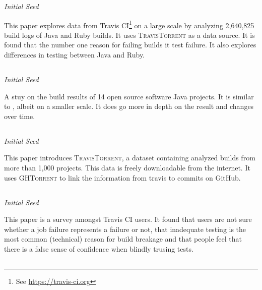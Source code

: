 \documentclass[]{book}
\let\rmarkdownfootnote\footnote%
\def\footnote{\protect\rmarkdownfootnote}
\begin{document}
\emph{Initial Seed}

This paper explores data from Travis CI\footnote{See
  \url{https://travis-ci.org}} on a large scale by analyzing 2,640,825
build logs of Java and Ruby builds. It uses \textsc{TravisTorrent} as a
data source. It is found that the number one reason for failing builds
it test failure. It also explores differences in testing between Java
and Ruby.

\subsection{\texorpdfstring{\citet{rausch2017empirical}}{@rausch2017empirical}}\label{rausch2017empirical}

\emph{Initial Seed}

A stuy on the build results of 14 open source software Java projects. It
is similar to \citet{beller2017oops}, albeit on a smaller scale. It does
go more in depth on the result and changes over time.

\subsection{\texorpdfstring{\citet{beller2017travistorrent}}{@beller2017travistorrent}}\label{beller2017travistorrent}

\emph{Initial Seed}

This paper introduces \textsc{TravisTorrent}, a dataset containing
analyzed builds from more than 1,000 projects. This data is freely
downloadable from the internet. It uses \textsc{GHTorrent} to link the
information from travis to commits on GitHub.

\subsection{\texorpdfstring{\citet{pinto2018work}}{@pinto2018work}}\label{pinto2018work}

\emph{Initial Seed}

This paper is a survey amongst Travis CI users. It found that users are
not sure whether a job failure represents a failure or not, that
inadequate testing is the most common (technical) reason for build
breakage and that people feel that there is a false sense of confidence
when blindly trusing tests.

\subsection{\texorpdfstring{\citet{zhao2017impact}}{@zhao2017impact}}\label{zhao2017impact}
\end{document}

